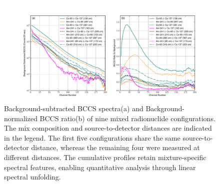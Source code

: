 \documentclass[10pt]{wlscirep}
\begin{document}


\newpage 

\begin{figure}[ht]
\centering
\includegraphics[width=\linewidth]{newfigures/figure2.pdf}
\caption{Background-subtracted BCCS spectra(a) and Background-normalized BCCS ratio(b) of nine mixed radionuclide configurations. The mix composition and source-to-detector distances are indicated in the legend. The first five configurations share the same source-to-detector distance, whereas the remaining four were measured at different distances. The cumulative profiles retain mixture-specific spectral features, enabling quantitative analysis through linear spectral unfolding.}
\label{fig:mixedbccs}
\end{figure}
\end{document}
